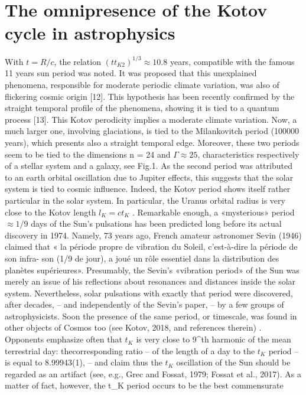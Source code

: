 \section {The omnipresence of the Kotov cycle in astrophysics}

With $t = R/c$, the relation $(t t_{K2} )^{1/3} \approx 10.8$ years, compatible with the famous 11 years sun period
was noted. It was proposed that this unexplained phenomena, responsible for moderate periodic
climate variation, was also of flickering cosmic origin [12]. This hypothesis has been recently
confirmed by the straight temporal profile of the phenomena, showing it is tied to a quantum
process [13].
This Kotov perodicity implies a moderate climate variation. Now, a much larger one, involving
glaciations, is tied to the Milankovitch period (100000 years), which presents also a straight
temporal edge. Moreover, these two periods seem to be tied to the dimensions n = 24 and $\Gamma \approx 25$,
characteristics respectively of a stellar system and a galaxy, see Fig.1. As the second period was
attributed to an earth orbital oscillation due to Jupiter effects, this suggests that the solar system is
tied to cosmic influence. Indeed, the Kotov period shows itself rather particular in the solar system.
In particular, the Uranus orbital radius is very close to the Kotov length $l_{K} = ct_{K}$ .
Remarkable enough, a «mysterious» period $\approx 1/9$ days of the Sun's pulsations has been predicted
long before its actual discovery in 1974. Namely, 73 years ago, French amateur astronomer Sevin
(1946) claimed that « la période propre de vibration du Soleil, c'est-à-dire la période de son infra-
son (1/9 de jour), a joué un rôle essentiel dans la distribution des planètes supérieures». Presumably,
the Sevin's «vibration period» of the Sun was merely an issue of his reflections about resonances
and distances inside the solar system. Nevertheless, solar pulsations with exactly that period were
discovered, after decades, – and independently of the Sevin's paper, – by a few groups of
astrophysicists. Soon the presence of the same period, or timescale, was found in other objects of
Cosmos too (see Kotov, 2018, and references therein) .
Opponents emphasize often that $t_{K}$ is very close to 9^{th} harmonic of the mean terrestrial day: thecorresponding ratio – of the length of a day to the $t_{K}$ period – is equal to 8.99943(1), – and claim
thus the $t_{K}$ oscillation of the Sun should be regarded as an artifact (see, e.g., Grec and Fossat, 1979;
Fossat et al., 2017). As a matter of fact, however, the t_K period occurs to be the best commensurate
